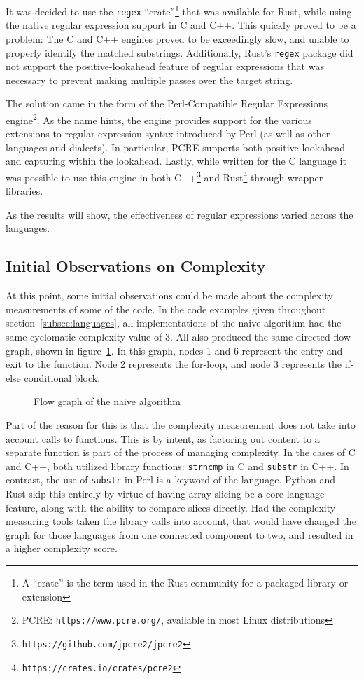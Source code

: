 It was decided to use the \texttt{regex} ``crate''\footnote{A ``crate'' is the term used in the Rust community for a packaged library or extension} that was available for Rust, while using the native regular expression support in C and C++. This quickly proved to be a problem: The C and C++ engines proved to be exceedingly slow, and unable to properly identify the matched substrings. Additionally, Rust's \texttt{regex} package did not support the positive-lookahead feature of regular expressions that was necessary to prevent making multiple passes over the target string.

The solution came in the form of the Perl-Compatible Regular Expressions engine\footnote{PCRE: \texttt{https://www.pcre.org/}, available in most Linux distributions}. As the name hints, the engine provides support for the various extensions to regular expression syntax introduced by Perl (as well as other languages and dialects). In particular, PCRE supports both positive-lookahead and capturing within the lookahead. Lastly, while written for the C language it was possible to use this engine in both C++\footnote{\texttt{https://github.com/jpcre2/jpcre2}} and Rust\footnote{\texttt{https://crates.io/crates/pcre2}} through wrapper libraries.

As the results will show, the effectiveness of regular expressions varied across the languages.

\subsection{Initial Observations on Complexity}

At this point, some initial observations could be made about the complexity measurements of some of the code. In the code examples given throughout section~\ref{subsec:languages}, all implementations of the naive algorithm had the same cyclomatic complexity value of 3. All also produced the same directed flow graph, shown in figure~\ref{fig:graph-naive}. In this graph, nodes 1 and 6 represent the entry and exit to the function. Node 2 represents the for-loop, and node 3 represents the if-else conditional block.

\begin{figure}[ht]
\centering

\caption{Flow graph of the naive algorithm}
\label{fig:graph-naive}
\end{figure}

Part of the reason for this is that the complexity measurement does not take into account calls to functions. This is by intent, as factoring out content to a separate function is part of the process of managing complexity. In the cases of C and C++, both utilized library functions: \texttt{strncmp} in C and \texttt{substr} in C++. In contrast, the use of \texttt{substr} in Perl is a keyword of the language. Python and Rust skip this entirely by virtue of having array-slicing be a core language feature, along with the ability to compare slices directly. Had the complexity-measuring tools taken the library calls into account, that would have changed the graph for those languages from one connected component to two, and resulted in a higher complexity score.

